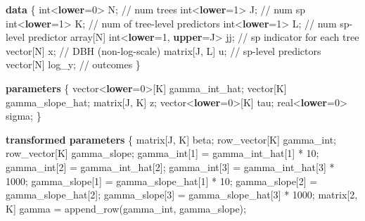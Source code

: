\documentclass[
  12pt,
  letterpaper,
  DIV=11,
  numbers=noendperiod]{scrartcl}
\newenvironment{Shaded}{\begin{snugshade}}{\end{snugshade}}
\newcommand{\CommentTok}[1]{\textcolor[rgb]{0.37,0.37,0.37}{#1}}
\newcommand{\DataTypeTok}[1]{\textcolor[rgb]{0.68,0.00,0.00}{#1}}
\newcommand{\DecValTok}[1]{\textcolor[rgb]{0.68,0.00,0.00}{#1}}
\newcommand{\KeywordTok}[1]{\textcolor[rgb]{0.00,0.23,0.31}{\textbf{#1}}}
\newcommand{\NormalTok}[1]{\textcolor[rgb]{0.00,0.23,0.31}{#1}}
\begin{document}
\begin{Shaded}
\begin{Highlighting}[]
\KeywordTok{data}\NormalTok{ \{}
  \DataTypeTok{int}\NormalTok{\textless{}}\KeywordTok{lower}\NormalTok{=}\DecValTok{0}\NormalTok{\textgreater{} N;                    }\CommentTok{// num trees}
  \DataTypeTok{int}\NormalTok{\textless{}}\KeywordTok{lower}\NormalTok{=}\DecValTok{1}\NormalTok{\textgreater{} J;                    }\CommentTok{// num sp}
  \DataTypeTok{int}\NormalTok{\textless{}}\KeywordTok{lower}\NormalTok{=}\DecValTok{1}\NormalTok{\textgreater{} K;                    }\CommentTok{// num of tree{-}level predictors}
  \DataTypeTok{int}\NormalTok{\textless{}}\KeywordTok{lower}\NormalTok{=}\DecValTok{1}\NormalTok{\textgreater{} L;                    }\CommentTok{// num sp{-}level predictor}
  \DataTypeTok{array}\NormalTok{[N] }\DataTypeTok{int}\NormalTok{\textless{}}\KeywordTok{lower}\NormalTok{=}\DecValTok{1}\NormalTok{, }\KeywordTok{upper}\NormalTok{=J\textgreater{} jj; }\CommentTok{// sp indicator for each tree}
  \DataTypeTok{vector}\NormalTok{[N] x;                       }\CommentTok{// DBH (non{-}log{-}scale)}
  \DataTypeTok{matrix}\NormalTok{[J, L] u;                    }\CommentTok{// sp{-}level predictors}
  \DataTypeTok{vector}\NormalTok{[N] log\_y;                   }\CommentTok{// outcomes}
\NormalTok{\}}

\KeywordTok{parameters}\NormalTok{ \{}
  \DataTypeTok{vector}\NormalTok{\textless{}}\KeywordTok{lower}\NormalTok{=}\DecValTok{0}\NormalTok{\textgreater{}[K] gamma\_int\_hat;}
  \DataTypeTok{vector}\NormalTok{[K] gamma\_slope\_hat;}
  \DataTypeTok{matrix}\NormalTok{[J, K] z;}
  \DataTypeTok{vector}\NormalTok{\textless{}}\KeywordTok{lower}\NormalTok{=}\DecValTok{0}\NormalTok{\textgreater{}[K] tau;}
  \DataTypeTok{real}\NormalTok{\textless{}}\KeywordTok{lower}\NormalTok{=}\DecValTok{0}\NormalTok{\textgreater{} sigma;}
\NormalTok{\}}

\KeywordTok{transformed parameters}\NormalTok{ \{}
  \DataTypeTok{matrix}\NormalTok{[J, K] beta;}
  \DataTypeTok{row\_vector}\NormalTok{[K] gamma\_int;}
  \DataTypeTok{row\_vector}\NormalTok{[K] gamma\_slope;}
\NormalTok{  gamma\_int[}\DecValTok{1}\NormalTok{] = gamma\_int\_hat[}\DecValTok{1}\NormalTok{] * }\DecValTok{10}\NormalTok{;}
\NormalTok{  gamma\_int[}\DecValTok{2}\NormalTok{] = gamma\_int\_hat[}\DecValTok{2}\NormalTok{];}
\NormalTok{  gamma\_int[}\DecValTok{3}\NormalTok{] = gamma\_int\_hat[}\DecValTok{3}\NormalTok{] * }\DecValTok{1000}\NormalTok{;}
\NormalTok{  gamma\_slope[}\DecValTok{1}\NormalTok{] = gamma\_slope\_hat[}\DecValTok{1}\NormalTok{] * }\DecValTok{10}\NormalTok{;}
\NormalTok{  gamma\_slope[}\DecValTok{2}\NormalTok{] = gamma\_slope\_hat[}\DecValTok{2}\NormalTok{];}
\NormalTok{  gamma\_slope[}\DecValTok{3}\NormalTok{] = gamma\_slope\_hat[}\DecValTok{3}\NormalTok{] * }\DecValTok{1000}\NormalTok{;}
  \DataTypeTok{matrix}\NormalTok{[}\DecValTok{2}\NormalTok{, K] gamma = append\_row(gamma\_int, gamma\_slope);}


\end{Highlighting}
\end{Shaded}
\end{document}
